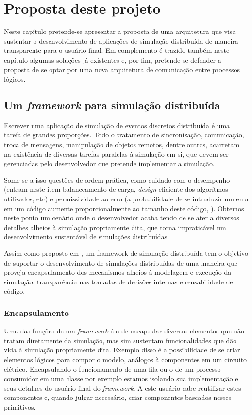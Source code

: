 \chapter{Proposta deste projeto}

Neste capítulo pretende-se apresentar a proposta de uma arquitetura que visa sustentar o desenvolvimento de aplicações de simulação distribuída de maneira transparente para o usuário final. Em complemento é trazido também neste capítulo algumas soluções já existentes e, por fim, pretende-se defender a proposta de se optar por uma nova arquitetura de comunicação entre processos lógicos.

\section{Um \textit{framework} para simulação distribuída}

Escrever uma aplicação de simulação de eventos discretos distribuída é uma tarefa de grandes proporções. Todo o tratamento de sincronização, comunicação, troca de mensagens, manipulação de objetos remotos, dentre outros, acarretam na existência de diversas tarefas paralelas à simulação em si, que devem ser gerenciadas pelo desenvolvedor que pretende implementar a simulação.

Some-se a isso questões de ordem prática, como cuidado com o desempenho (entram neste ítem balanceamento de carga, \textit{design} eficiente dos algorítmos utilizados, etc) e permissividade ao erro (a probabilidade de se intruduzir um erro em um código aumente proporcionalmente ao tamanho deste código, \cite{HONGYU09}). Obtemos neste ponto um cenário onde o desenvolvedor acaba tendo de se ater a diversos detalhes alheios à simulação propriamente dita, que torna impraticável um desenvolvimento sustentável de simulações distribuídas.

Assim como proposto em \cite{LIVERSON}, um framework de simulação distribuída tem o objetivo de suportar o desenvolvimento de simulações distribuídas de uma maneira que proveja encapsulamento dos mecanismos alheios à modelagem e execução da simulação, transparência nas tomadas de decisões internas e reusabilidade de código.

\subsection{Encapsulamento}

Uma das funções de um \textit{framework} é o de encapsular diversos elementos que não tratam diretamente da simulação, mas sim sustentam funcionalidades que dão vida à simulação propriamente dita. Exemplo disso é a possibilidade de se criar elementos lógicos para compor o modelo, análogos à componentes em um circuito elétrico. Encapsulando o funcionamento de uma fila ou o de um processo consumidor em uma classe por exemplo estamos isolando sua implementação e seus detalhes do usuário final do \textit{framework}. A este usuário cabe reutilizar estes componentes e, quando julgar necessário, criar componentes baseados nesses primitivos.


